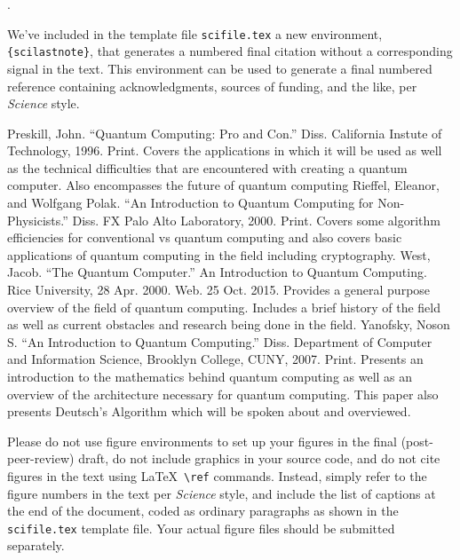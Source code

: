 \documentclass[12pt]{article}
\newcounter{lastnote}
\newenvironment{scilastnote}{%
\setcounter{lastnote}{\value{enumiv}}%
\addtocounter{lastnote}{+1}%
\begin{list}%
{\arabic{lastnote}.}
{\setlength{\leftmargin}{.22in}}
{\setlength{\labelsep}{.5em}}}
{\end{list}}
\begin{document}

\begin{scilastnote}
\item We've included in the template file \texttt{scifile.tex} a new
environment, \texttt{\{scilastnote\}}, that generates a numbered final
citation without a corresponding signal in the text.  This environment
can be used to generate a final numbered reference containing
acknowledgments, sources of funding, and the like, per {\it Science\/}
style.
\end{scilastnote}

\newpage

\begin{thebibliography}{1}
Preskill, John. ``Quantum Computing: Pro and Con.'' Diss. California Instute of Technology, 1996. Print. Covers the applications in which it will be used as well as the technical difficulties that are encountered with creating a quantum computer. Also encompasses the future of quantum computing
Rieffel, Eleanor, and Wolfgang Polak. ``An Introduction to Quantum Computing for Non-Physicists.'' Diss. FX Palo Alto Laboratory, 2000. Print. Covers some algorithm efficiencies for conventional vs quantum computing and also covers basic applications of quantum computing in the field including cryptography.
West, Jacob. ``The Quantum Computer.'' An Introduction to Quantum Computing. Rice University, 28 Apr. 2000. Web. 25 Oct. 2015. Provides a general purpose overview of the field of quantum computing. Includes a brief history of the field as well as current obstacles and research being done in the field.
Yanofsky, Noson S. ``An Introduction to Quantum Computing.'' Diss. Department of Computer and Information Science, Brooklyn College, CUNY, 2007. Print. Presents an introduction to the mathematics behind quantum computing as well as an overview of the architecture necessary for quantum computing. This paper also presents Deutsch's Algorithm which will be spoken about and overviewed.
\end{thebibliography}

\clearpage

 Please do not use figure environments to set
up your figures in the final (post-peer-review) draft, do not include graphics in your
source code, and do not cite figures in the text using \LaTeX\
\verb+\ref+ commands.  Instead, simply refer to the figure numbers in
the text per {\it Science\/} style, and include the list of captions at
the end of the document, coded as ordinary paragraphs as shown in the
\texttt{scifile.tex} template file.  Your actual figure files should
be submitted separately.
\end{document}
